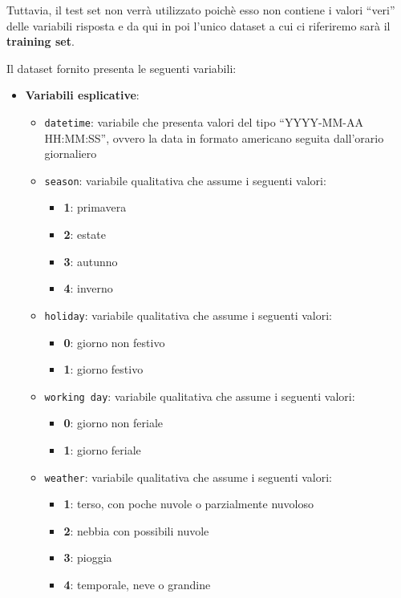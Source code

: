 Tuttavia, il test set non verrà utilizzato poichè esso non contiene i valori
``veri'' delle variabili risposta e da qui in poi l'unico dataset a cui ci
riferiremo sarà il \textbf{training set}.

Il dataset fornito presenta le seguenti variabili:

\begin{itemize}
\item \textbf{Variabili esplicative}:
  \begin{itemize}
  \item \texttt{datetime}: variabile che presenta valori del tipo ``YYYY-MM-AA
    HH:MM:SS'', ovvero la data in formato americano seguita dall'orario
    giornaliero

  \item \texttt{season}: variabile qualitativa che assume i seguenti valori:
    \begin{itemize}
    \item \textbf{1}: primavera
    \item \textbf{2}: estate
    \item \textbf{3}: autunno
    \item \textbf{4}: inverno
    \end{itemize}

  \item \texttt{holiday}: variabile qualitativa che assume i seguenti valori:
    \begin{itemize}
    \item \textbf{0}: giorno non festivo
    \item \textbf{1}: giorno festivo
    \end{itemize}

  \item \texttt{working day}: variabile qualitativa che assume i seguenti
    valori:
    \begin{itemize}
    \item \textbf{0}: giorno non feriale
    \item \textbf{1}: giorno feriale
    \end{itemize}

  \item \texttt{weather}: variabile qualitativa che assume i seguenti
    valori:
    \begin{itemize}
    \item \textbf{1}: terso, con poche nuvole o parzialmente nuvoloso
    \item \textbf{2}: nebbia con possibili nuvole
    \item \textbf{3}: pioggia
    \item \textbf{4}: temporale, neve o grandine
    \end{itemize}


\end{itemize}
\end{itemize}
